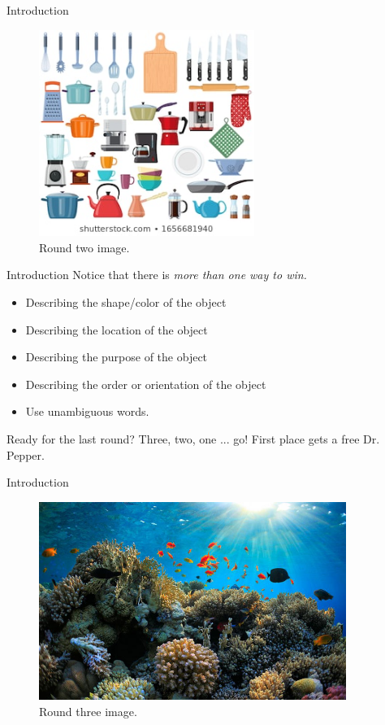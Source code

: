 \documentclass{beamer}
\begin{document}
\begin{frame}{Introduction}
\begin{figure}
\includegraphics[width=7cm]{figures/kitchen1.jpg}
\caption{\label{fig:kitchen1} Round two image.}
\end{figure}
\end{frame}

\begin{frame}{Introduction}
Notice that there is \textit{more than one way to win.}
\begin{itemize}
\item Describing the shape/color of the object
\item Describing the location of the object
\item Describing the purpose of the object
\item Describing the order or orientation of the object
\item Use unambiguous words.
\end{itemize}
Ready for the last round?  Three, two, one ... go!  First place gets a free Dr. Pepper.
\end{frame}

\begin{frame}{Introduction}
\begin{figure}
\includegraphics[width=10cm]{figures/coral1.jpg}
\caption{\label{fig:coral1} Round three image.}
\end{figure}
\end{frame}
\end{document}

